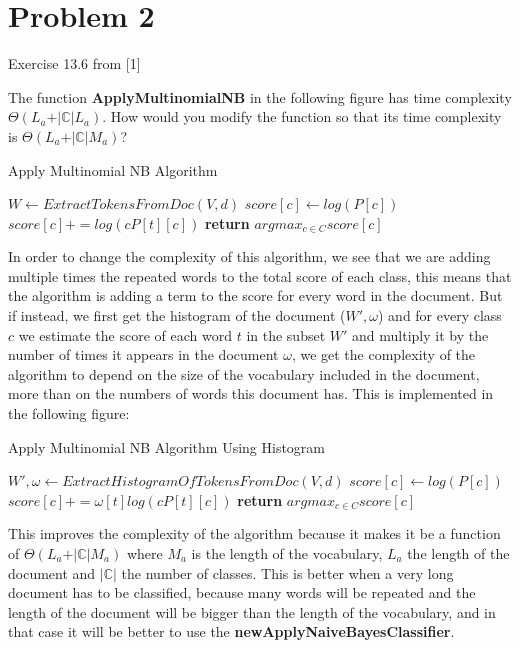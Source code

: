 \section{Problem 2}
Exercise 13.6 from [1]

The function \textbf{ApplyMultinomialNB} in the following figure has time complexity $\Theta( L_{a}+\vert\mathbb{C}\vert L_{a})$. How would you modify the function so that its time complexity is $\Theta( L_{a}+\vert\mathbb{C}\vert M_{a})$? 

\begin{algorithm}[H]
    \caption{Apply Multinomial NB Algorithm}\label{alg:}
    \begin{algorithmic}[1]
            \State $W \gets ExtractTokensFromDoc(V,d)$
                \State $score[c] \gets log(P[c])$
                    \State $score[c] += log(cP[t][c])$
                \EndFor
            \EndFor
            \State \textbf{return} $argmax_{c \in C} score[c]$
        \EndProcedure
    \end{algorithmic}
\end{algorithm}

In order to change the complexity of this algorithm, we see that we are adding multiple times the repeated words to the total score of each class, this means that the algorithm is adding a term to the score for every word in the document. But if instead, we first get the histogram of the document ($W', \omega$) and for every class $c$ we estimate the score of each word $t$ in the subset $W'$ and multiply it by the number of times it appears in the document $\omega$, we get the complexity of the algorithm to depend on the size of the vocabulary included in the document, more than on the numbers of words this document has. This is implemented in the following figure:

\begin{algorithm}[H]
\caption{Apply Multinomial NB Algorithm Using Histogram}\label{alg:}
\begin{algorithmic}[1]
        \State $W', \omega \gets ExtractHistogramOfTokensFromDoc(V,d)$
            \State $score[c] \gets log(P[c])$
                \State $score[c] += \omega[t] log(cP[t][c])$
            \EndFor
        \EndFor
        \State \textbf{return} $argmax_{c \in C} score[c]$
    \EndProcedure
\end{algorithmic}
\end{algorithm}

This improves the complexity of the algorithm because it makes it be a function of $\Theta( L_{a}+\vert\mathbb{C}\vert M_{a})$ where $M_a$ is the length of the vocabulary, $L_a$ the length of the document and $\vert\mathbb{C}\vert$ the number of classes. This is better when a very long document has to be classified, because many words will be repeated and the length of the document will be bigger than the length of the vocabulary, and in that case it will be better to use the \textbf{newApplyNaiveBayesClassifier}.
